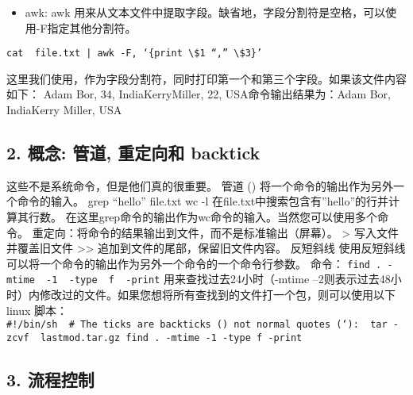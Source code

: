 \documentclass[]{book}
\providecommand{\tightlist}{%
  \setlength{\itemsep}{0pt}\setlength{\parskip}{0pt}}
\begin{document}
\begin{itemize}
\tightlist
\item
  awk: awk 用来从文本文件中提取字段。缺省地，字段分割符是空格，可以使用-F指定其他分割符。
\end{itemize}

\begin{verbatim}
cat  file.txt | awk -F, ‘{print \$1 “,” \$3}’
\end{verbatim}

这里我们使用，作为字段分割符，同时打印第一个和第三个字段。如果该文件内容如下： Adam Bor, 34, IndiaKerryMiller, 22, USA命令输出结果为：Adam Bor, IndiaKerry Miller, USA

\hypertarget{ux6982ux5ff5-ux7ba1ux9053-ux91cdux5b9aux5411ux548c-backtick}{%
\subsection{2. 概念: 管道, 重定向和 backtick}\label{ux6982ux5ff5-ux7ba1ux9053-ux91cdux5b9aux5411ux548c-backtick}}

这些不是系统命令，但是他们真的很重要。
管道 (\textbar{}) 将一个命令的输出作为另外一个命令的输入。
grep ``hello'' file.txt \textbar{} wc -l
在file.txt中搜索包含有''hello''的行并计算其行数。
在这里grep命令的输出作为wc命令的输入。当然您可以使用多个命令。
重定向：将命令的结果输出到文件，而不是标准输出（屏幕）。
\textgreater{} 写入文件并覆盖旧文件
\textgreater{}\textgreater{} 追加到文件的尾部，保留旧文件内容。
反短斜线
使用反短斜线可以将一个命令的输出作为另外一个命令的一个命令行参数。
命令：
\texttt{find\ .\ -mtime\ \ -1\ \ -type\ \ f\ \ -print}
用来查找过去24小时（-mtime --2则表示过去48小时）内修改过的文件。如果您想将所有查找到的文件打一个包，则可以使用以下linux 脚本：
\texttt{\#!/bin/sh\ \ \#\ The\ ticks\ are\ backticks\ (\textasciigrave{})\ not\ normal\ quotes\ (‘):\ \ tar\ -zcvf\ \ lastmod.tar.gz\ \textasciigrave{}find\ .\ -mtime\ -1\ -type\ f\ -print\textasciigrave{}}

\hypertarget{ux6d41ux7a0bux63a7ux5236}{%
\subsection{3. 流程控制}\label{ux6d41ux7a0bux63a7ux5236}}
\end{document}
